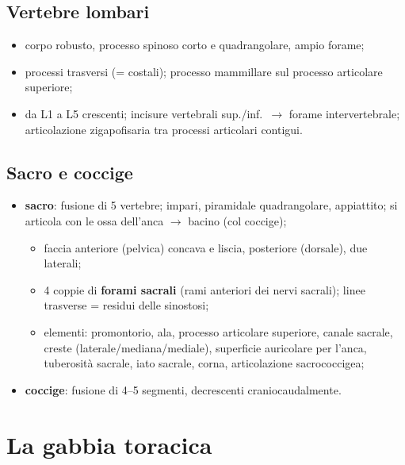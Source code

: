\subsection{Vertebre lombari}
\begin{itemize}
  \item corpo robusto, processo spinoso corto e quadrangolare, ampio forame;
  \item processi trasversi (= costali); processo mammillare sul processo articolare superiore;
  \item da L1 a L5 crescenti; incisure vertebrali sup./inf.\ $\rightarrow$ forame intervertebrale;
    articolazione zigapofisaria tra processi articolari contigui.
\end{itemize}

\subsection{Sacro e coccige}
\begin{itemize}
  \item \textbf{sacro}: fusione di 5 vertebre; impari, piramidale quadrangolare, appiattito;
    si articola con le ossa dell'anca $\rightarrow$ bacino (col coccige);
    \begin{itemize}
      \item faccia anteriore (pelvica) concava e liscia, posteriore (dorsale), due laterali;
      \item 4 coppie di \textbf{forami sacrali} (rami anteriori dei nervi sacrali); linee trasverse
        = residui delle sinostosi;
      \item elementi: promontorio, ala, processo articolare superiore, canale sacrale, creste
        (laterale/mediana/mediale), superficie auricolare per l'anca, tuberosità sacrale, iato
        sacrale, corna, articolazione sacrococcigea;
    \end{itemize}
  \item \textbf{coccige}: fusione di 4--5 segmenti, decrescenti craniocaudalmente.
\end{itemize}

\section{La gabbia toracica}

